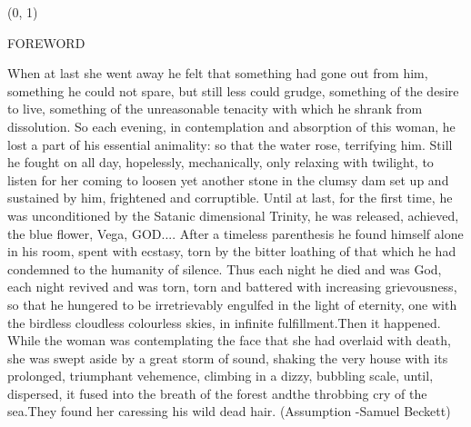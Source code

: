 \documentclass[11pt]{article}
\begin{document}
\begin{textblock}{23}(0, 1)
\begin{center}
\huge FOREWORD
\end{center}
\end{textblock}

\vspace*{0.25\baselineskip}

\begingroup
\begin{center}
When at last she went away he felt that something had gone out from him, something he could not spare, but still less could grudge, something of the desire to live, something of the unreasonable tenacity with which he shrank from dissolution. So each evening, in contemplation and absorption of this woman, he lost a part of his essential animality: so that the water rose, terrifying him. Still he fought on all day, hopelessly, mechanically, only relaxing with twilight, to listen for her coming to loosen yet another stone in the clumsy dam set up and sustained by him, frightened and corruptible. Until at last, for the first time, he was unconditioned by the Satanic dimensional Trinity, he was released, achieved, the blue flower, Vega, GOD.... After a timeless parenthesis he found himself alone in his room, spent with ecstasy, torn by the bitter loathing of that which he had condemned to the humanity of silence. Thus each night he died and was God, each night revived and was torn, torn and battered with increasing grievousness, so that he hungered to be irretrievably engulfed in the light of eternity, one with the birdless cloudless colourless skies, in infinite fulfillment.Then it happened. While the woman was contemplating the face that she had overlaid with death, she was swept aside by a great storm of sound, shaking the very house with its prolonged, triumphant vehemence, climbing in a dizzy, bubbling scale, until, dispersed, it fused into the breath of the forest andthe throbbing cry of the sea.They found her caressing his wild dead hair.
\rightskip\leftskip
\phantom{text} \hfill (Assumption -Samuel Beckett)
\end{center}
\endgroup

\vspace*{0.25\baselineskip}
\end{document}
